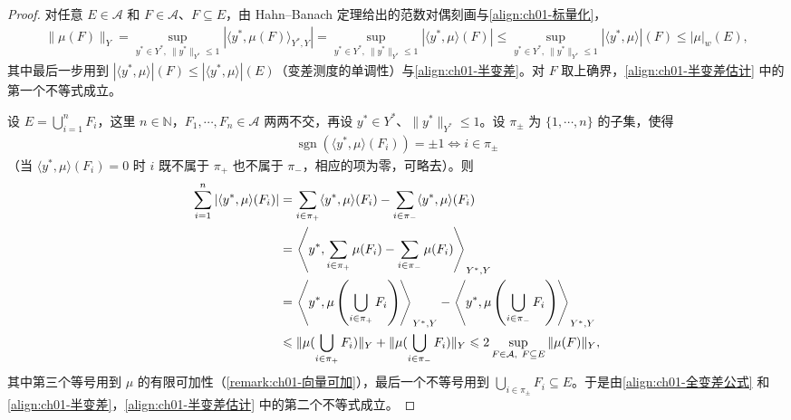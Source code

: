 \documentclass[../../main.tex]{subfiles}%
\begin{document}
\begin{proof}
对任意 $E\in\mathcal{A}$ 和 $F\in\mathcal{A}$、$F\subseteq E$，由 Hahn--Banach 定理给出的范数对偶刻画与\eqref{align:ch01-标量化}，
\begin{align}
\|\mu(F)\|_Y=\sup_{y^*\in Y^*,\ \|y^*\|_{Y^*}\leqslant1}\left|\langle y^*,\mu(F)\rangle_{Y^*,Y}\right|
=\sup_{y^*\in Y^*,\ \|y^*\|_{Y^*}\leqslant1}\left|\langle y^*,\mu\rangle(F)\right|
\leqslant\sup_{y^*\in Y^*,\ \|y^*\|_{Y^*}\leqslant1}\left|\langle y^*,\mu\rangle\right|(F)\leqslant|\mu|_w(E), \label{align:ch01-半变差估计1}
\end{align}
其中最后一步用到 $\left|\langle y^*,\mu\rangle\right|(F)\leqslant\left|\langle y^*,\mu\rangle\right|(E)$（变差测度的单调性）与\eqref{align:ch01-半变差}。对 $F$ 取上确界，\eqref{align:ch01-半变差估计} 中的第一个不等式成立。

设 $E=\bigcup_{i=1}^n F_i$，这里 $n\in\mathbb{N}$，$F_1,\cdots ,F_n\in\mathcal{A}$ 两两不交，再设 $y^*\in Y^*$、$\|y^*\|_{Y^*}\leqslant1$。设 $\pi_\pm$ 为 $\{1,\cdots ,n\}$ 的子集，使得
\begin{align*}
\operatorname{sgn}\left(\langle y^*,\mu\rangle(F_i)\right)=\pm1\Longleftrightarrow i\in\pi_\pm
\end{align*}
（当 $\langle y^*,\mu\rangle(F_i)=0$ 时 $i$ 既不属于 $\pi_+$ 也不属于 $\pi_-$，相应的项为零，可略去）。则
\begin{align}
\sum_{i=1}^n\left|\langle y^*,\mu\rangle(F_i)\right|
&=\sum_{i\in\pi_+}\langle y^*,\mu\rangle(F_i)-\sum_{i\in\pi_-}\langle y^*,\mu\rangle(F_i)\notag\\
&=\left\langle y^*,\sum_{i\in\pi_+}\mu(F_i)-\sum_{i\in\pi_-}\mu(F_i)\right\rangle_{Y^*,Y}\notag\\
&=\left\langle y^*,\mu\left(\bigcup_{i\in\pi_+}F_i\right)\right\rangle_{Y^*,Y}
-\left\langle y^*,\mu\left(\bigcup_{i\in\pi_-}F_i\right)\right\rangle_{Y^*,Y}\notag\\
&\leqslant\|\mu(\bigcup_{i\in\pi_+}F_i)\|_Y+\|\mu(\bigcup_{i\in\pi_-}F_i)\|_Y
\leqslant 2\sup_{F\in\mathcal{A},\ F\subseteq E}\|\mu(F)\|_Y, \label{align:ch01-半变差估计2}
\end{align}
其中第三个等号用到 $\mu$ 的有限可加性（\cref{remark:ch01-向量可加}），最后一个不等号用到 $\bigcup_{i\in\pi_\pm}F_i\subseteq E$。于是由\eqref{align:ch01-全变差公式} 和\eqref{align:ch01-半变差}，\eqref{align:ch01-半变差估计} 中的第二个不等式成立。
\end{proof}
\end{document}
